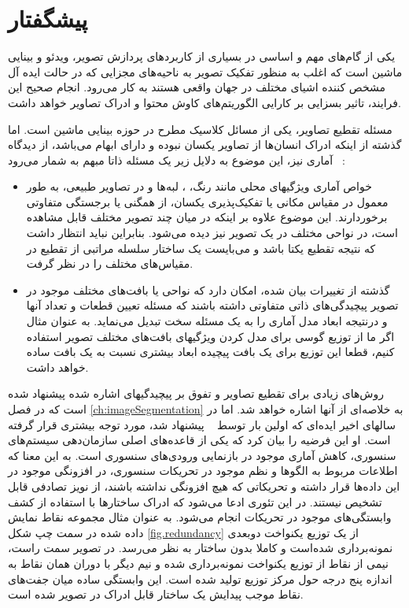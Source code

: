 \chapter{پیشگفتار}
{}
یکی از گام‌های مهم و اساسی در بسیاری از کاربردهای پردازش تصویر، ویدئو و بینایی ماشین است که اغلب به منظور تفکیک تصویر به ناحیه‌های مجزایی که در حالت ایده آل مشخص کننده اشیای مختلف در جهان واقعی هستند به کار می‌رود.
انجام صحیح این فرایند، تاثیر بسزایی بر کارایی الگوریتم‌های کاوش محتوا و ادراک تصاویر خواهد داشت.

مسئله تقطیع تصاویر، یکی از مسائل کلاسیک مطرح در حوزه بینایی ماشین است.
اما گذشته از اینکه ادراک انسان‌ها از تصاویر یکسان نبوده و دارای ابهام می‌باشد، از دیدگاه آماری نیز، این موضوع به دلایل زیر یک مسئله ذاتا مبهم به شمار می‌رود%
~\cite{yang_unsupervised_2008}:

\begin{itemize}
\item
خواص آماری ویژگیهای محلی مانند رنگ،
{}،
لبه‌ها و
{}
در تصاویر طبیعی، به طور معمول در مقیاس مکانی یا تفکیک‌پذیری یکسان، از همگنی یا برجستگی متفاوتی برخوردارند.
	این موضوع علاوه بر اینکه در میان چند تصویر مختلف قابل مشاهده است، در نواحی مختلف در یک تصویر نیز دیده می‌شود.
	بنابراین نباید انتظار داشت که نتیجه تقطیع یکتا باشد و می‌بایست یک ساختار سلسله مراتبی از تقطیع در مقیاس‌های مختلف را در نظر گرفت.
\item 
	گذشته از تغییرات بیان شده، امکان دارد که نواحی یا بافت‌های مختلف موجود در تصویر پیچیدگی‌های ذاتی متفاوتی داشته باشند که مسئله تعیین قطعات و تعداد آنها و درنتیجه ابعاد مدل آماری را به یک مسئله سخت تبدیل می‌نماید.
	به عنوان مثال اگر ما از توزیع گوسی برای مدل کردن ویژگیهای بافت‌های مختلف تصویر استفاده کنیم، قطعا این توزیع برای یک بافت پیچیده ابعاد بیشتری نسبت به یک بافت ساده خواهد داشت.
\end{itemize}

روش‌های زیادی برای تقطیع تصاویر و تفوق بر پیچیدگیهای اشاره شده پیشنهاد شده است که در فصل
\ref{ch:imageSegmentation}
به خلاصه‌ای از آنها اشاره خواهد شد.
اما در سالهای اخیر ایده‌ای که اولین بار توسط
%
~\cite{barlow_possible_1961}
پیشنهاد شد، مورد توجه بیشتری قرار گرفته است.
او این فرضیه را بیان کرد که یکی از قاعده‌های اصلی سازمان‌دهی سیستم‌های سنسوری، کاهش
{}
آماری موجود در بازنمایی ورودی‌های سنسوری است.
به این معنا که اطلاعات مربوط به الگوها و نظم موجود در تحریکات سنسوری، در افزونگی موجود در این داده‌ها قرار داشته و تحریکاتی که هیچ افزونگی نداشته باشند، از نویز تصادفی قابل تشخیص نیستند.
در این تئوری ادعا می‌شود که ادراک ساختارها با استفاده از کشف وابستگی‌های موجود در تحریکات انجام می‌شود.
به عنوان مثال مجموعه نقاط نمایش داده شده در سمت چپ شکل
\ref{fig.redundancy}
از یک توزیع یکنواخت دوبعدی نمونه‌برداری شده‌است و کاملا بدون ساختار به نظر می‌رسد.
در تصویر سمت راست، نیمی از نقاط از توزیع یکنواخت نمونه‌برداری شده و نیم دیگر با دوران همان نقاط به اندازه پنج درجه حول مرکز توزیع تولید شده است.
این وابستگی ساده میان جفت‌های نقاط موجب پیدایش یک ساختار قابل ادراک در تصویر شده است.

